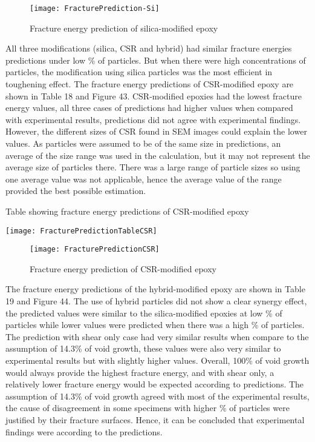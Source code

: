 \documentclass[numbers=noendperiod,chapterprefix=on]{icldt} %
\begin{document}
\begin{figure}[!htpb]
\centering
\texttt{[image: FracturePrediction-Si]}
\caption{Fracture energy prediction of silica-modified epoxy}
\end{figure}

All three modifications (silica, CSR and hybrid) had similar fracture energies predictions under low \% of particles. But when there were high concentrations of particles, the modification using silica particles was the most efficient in toughening effect. 
The fracture energy predictions of CSR-modified epoxy are shown in Table 18 and Figure 43. CSR-modified epoxies had the lowest fracture energy values, all three cases of predictions had higher values when compared with experimental results, predictions did not agree with experimental findings. However, the different sizes of CSR found in SEM images could explain the lower values. As particles were assumed to be of the same size in predictions, an average of the size range was used in the calculation, but it may not represent the average size of particles there. There was a large range of particle sizes so using one average value was not applicable, hence the average value of the range provided the best possible estimation.

\begin{table}[!htpb]
\centering
\caption{Table showing fracture energy predictions of CSR-modified epoxy} %
\texttt{[image: FracturePredictionTableCSR]}
\end{table}

\begin{figure}[!htpb]
\centering
\texttt{[image: FracturePredictionCSR]}
\caption{Fracture energy prediction of CSR-modified epoxy}
\end{figure}

The fracture energy predictions of the hybrid-modified epoxy are shown in Table 19 and Figure 44. The use of hybrid particles did not show a clear synergy effect, the predicted values were similar to the silica-modified epoxies at low \% of particles while lower values were predicted when there was a high \% of particles. The prediction with shear only case had very similar results when compare to the assumption of 14.3\% of void growth, these values were also very similar to experimental results but with slightly higher values.
Overall, 100\% of void growth would always provide the highest fracture energy, and with shear only, a relatively lower fracture energy would be expected according to predictions. The assumption of 14.3\% of void growth agreed with most of the experimental results, the cause of disagreement in some specimens with higher \% of particles were justified by their fracture surfaces. Hence, it can be concluded that experimental findings were according to the predictions. 
\end{document}
